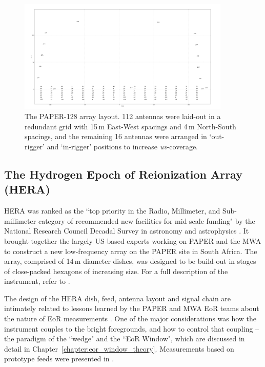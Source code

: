 \begin{figure}
\centering
\includegraphics[width=0.9\textwidth]{chapters/instruments/figures/antlayout_psa128.png}
\caption[The PAPER-128 array layout.]{The PAPER-128 array layout. 112 antennas were laid-out in a redundant grid with 15\,m East-West spacings and 4\,m North-South spacings, and the remaining 16 antennas were arranged in `out-rigger' and `in-rigger' positions to increase \textit{uv}-coverage.}
\end{figure}

\subsection{The Hydrogen Epoch of Reionization Array (HERA)}
\label{subsec:hera_instrument}

HERA was ranked as the ``top priority in the Radio, Millimeter, and Sub-millimeter category of recommended new facilities for mid-scale funding" by the National Research Council Decadal Survey in astronomy and astrophysics \citep{Astro2010}. It brought together the largely US-based experts working on PAPER and the MWA to construct a new low-frequency array on the PAPER site in South Africa. The array, comprised of 14\,m diameter dishes, was designed to be build-out in stages of close-packed hexagons of increasing size. For a full description of the instrument, refer to \cite{deBoer.17}.

The design of the HERA dish, feed, antenna layout and signal chain are intimately related to lessons learned by the PAPER and MWA EoR teams about the nature of EoR measurements \citep[e.g.][]{Nithya.15a}. One of the major considerations was how the instrument couples to the bright foregrounds, and how to control that coupling -- the paradigm of the ``wedge" and the ``EoR Window", which are discussed in detail in Chapter~\ref{chapter:eor_window_theory}. Measurements based on prototype feeds were presented in \cite[][Patra et al. \textit{submitted}]{Ewall-Wice.16.HERA_Dish, Neben.16}.


